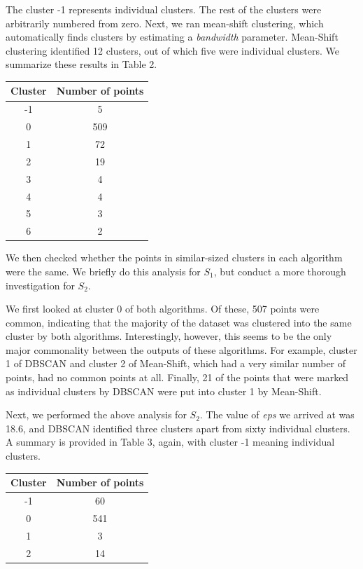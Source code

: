 \documentclass[12pt,a4paper,twocolumn]{article}
\begin{document}
	The cluster -1 represents individual clusters. The rest of the clusters were arbitrarily numbered from zero. Next, we ran mean-shift clustering, which automatically finds clusters by estimating a \textit{bandwidth} parameter. Mean-Shift clustering identified 12 clusters, out of which five were individual clusters. We summarize these results in Table 2.\\
	
	\begin{tabular}{|c|c|}
		\hline 
		\textbf{Cluster} & \textbf{Number of points} \\ 
		\hline 
		-1 & 5 \\ 
		\hline 
		0 & 509 \\ 
		\hline 
		1 & 72 \\ 
		\hline 
		2 & 19 \\ 
		\hline 
		3 & 4 \\ 
		\hline 
		4 & 4 \\ 
		\hline 
		5 & 3 \\ 
		\hline 
		6 & 2 \\ 
		\hline 
	\end{tabular}
	\begingroup
	\endgroup
	\hfill\break
	
	We then checked whether the points in similar-sized clusters in each algorithm were the same. We briefly do this analysis for $S_1$, but conduct a more thorough investigation for $S_2$.
	
	We first looked at cluster 0 of both algorithms. Of these, 507 points were common, indicating that the majority of the dataset was clustered into the same cluster by both algorithms. Interestingly, however, this seems to be the only major commonality between the outputs of these algorithms. For example, cluster 1 of DBSCAN and cluster 2 of Mean-Shift, which had a very similar number of points, had no common points at all. Finally, 21 of the points that were marked as individual clusters by DBSCAN were put into cluster 1 by Mean-Shift.
	
	Next, we performed the above analysis for $S_2$. The value of \textit{eps} we arrived at was 18.6, and DBSCAN identified three clusters apart from sixty individual clusters. A summary is provided in Table 3, again, with cluster -1 meaning individual clusters.\\
	
	\begin{tabular}{|c|c|}
		\hline 
		\textbf{Cluster} & \textbf{Number of points} \\ 
		\hline 
		-1 & 60 \\ 
		\hline 
		0 & 541 \\ 
		\hline 
		1 & 3 \\ 
		\hline 
		2 & 14 \\ 
		\hline 
	\end{tabular} 
	\begingroup
	\endgroup
	\hfill\break
	
\end{document}
